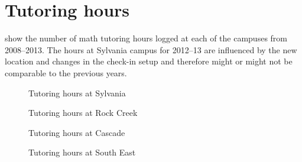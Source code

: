\chapter{Tutoring hours}\label{app:sec:tutoringhours}

 show
the number of math tutoring hours logged at each of the campuses from 2008--2013. The hours at Sylvania campus for 2012--13 are influenced by the new location and changes in the check-in setup and therefore might or might not be comparable to the previous years.


\begin{figure}[!htb]
	\captionsetup{skip=0pt}
  \begin{widepage}
  \begin{minipage}{.4\textwidth}
    \centering
	
    \caption{Tutoring hours at Sylvania}
    \label{app:fig:tutoringsylvania}
  \end{minipage}%
  \hfill
  \begin{minipage}{.4\textwidth}
    \centering
	
    \caption{Tutoring hours at Rock Creek}
    \label{app:fig:tutoringrockcreek}
  \end{minipage}%
  \end{widepage}
\end{figure}

\begin{figure}[!htb]
	\captionsetup{skip=0pt}
  \begin{widepage}
  \begin{minipage}{.4\textwidth}
    \centering
	
    \caption{Tutoring hours at Cascade}
    \label{app:fig:tutoringCascade}
  \end{minipage}%
  \hfill
  \begin{minipage}{.4\textwidth}
    \centering
	
    \caption{Tutoring hours at South East}
    \label{app:fig:tutoringsoutheast}
  \end{minipage}%
  \end{widepage}
\end{figure}

